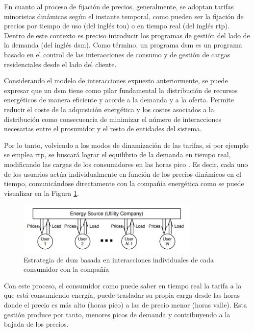 \vspace{1mm}

En cuanto al proceso de fijación de precios, generalmente, se adoptan tarifas minoristas dinámicas según el instante temporal, como pueden ser la fijación de precios por tiempo de uso (del inglés \gls{tou}) o en tiempo real (del inglés \gls{rtp}). Dentro de este contexto es preciso introducir los programas de gestión del lado de la demanda (del inglés \gls{dsm}). Como término, un programa \gls{dsm} es un programa basado en el control de las interacciones de consumo y de gestión de cargas residenciales desde el lado del cliente. 

\vspace{3mm}

Considerando el modelo de interacciones expuesto anteriormente, se puede expresar que un \gls{dsm} tiene como pilar fundamental la distribución de recursos energéticos de manera eficiente y acorde a la demanda y a la oferta. Permite reducir el coste de la adquisición energética y los costes asociados a la distribución como consecuencia de minimizar el número de interacciones necesarias entre el prosumidor y el resto de entidades del sistema. \cite{dsm}

\vspace{3mm}

Por lo tanto, volviendo a los modos de dinamización de las tarifas, si por ejemplo se emplea \gls{rtp}, se buscará lograr el equilibrio de la demanda en tiempo real, modificando las cargas de los consumidores en las horas pico \cite{rtp}. Es decir, cada uno de los usuarios actúa individualmente en función de los precios dinámicos en el tiempo, comunicándose directamente con la compañía energética como se puede visualizar en la Figura \ref{fig:dsm1}. 

\begin{figure}[h!]
  \centering
  \includegraphics[width=0.8\textwidth]{img/teoria/dsm1.png}
  \caption{Estrategia de \acrshort{dsm} basada en interacciones individuales de cada consumidor con la compañía \cite{pricing}}
  \label{fig:dsm1}
\end{figure}

Con este proceso, el consumidor como puede saber en tiempo real la tarifa a la que está consumiendo energía, puede trasladar su propia carga desde las horas donde el precio es más alto (horas pico) a las de precio menor (horas valle). Esta gestión produce por tanto, menores picos de demanda y contribuyendo a la bajada de los precios. \cite{dsm} \cite{pricing}

